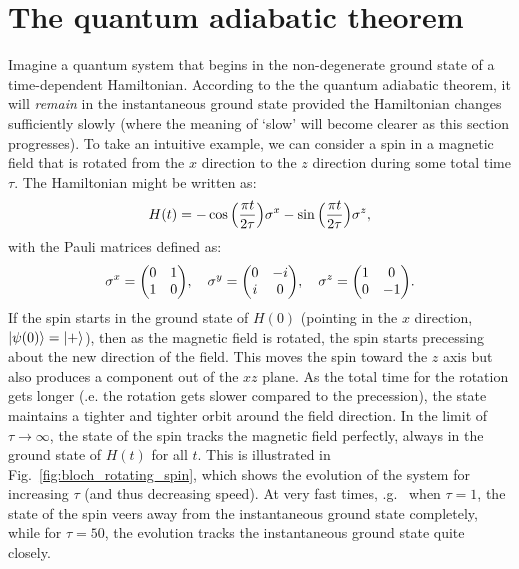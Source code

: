     \section{The quantum adiabatic theorem}\label{sec:2.1_adiabatic_theorem}
    
    Imagine a quantum system that begins in the non-degenerate ground state of a time-dependent Hamiltonian. According to the the quantum adiabatic theorem, it will \emph{remain} in the instantaneous ground state provided the Hamiltonian changes sufficiently slowly (where the meaning of `slow' will become clearer as this section progresses). To take an intuitive example, we can consider a spin in a magnetic field that is rotated from the $x$ direction to the $z$ direction during some total time $\tau$. The Hamiltonian might be written as:
    \begin{equation}\label{eq:rotating_spin_H}
        H(t) = -\cos\Big(\frac{\pi t}{2 \tau}\Big)\sigma^x - \sin \Big(\frac{\pi t}{2 \tau}\Big)\sigma^z,
    \end{equation}
    with the Pauli matrices defined as:
    \begin{equation}
        \sx = \mqty(0 & 1 \\ 1 & 0), \quad \sy = \mqty(0 & -i \\ i & 0), \quad \sz = \mqty(1 & 0 \\ 0 & -1).  
    \end{equation}
    If the spin starts in the ground state of $H(0)$ (pointing in the $x$ direction, $\ket{\psi(0)} = \ket{+}$), then as the magnetic field is rotated, the spin starts precessing about the new direction of the field. This moves the spin toward the $z$ axis but also produces a component out of the $xz$ plane. As the total time for the rotation gets longer (\@i.e. the rotation gets slower compared to the precession), the state maintains a tighter and tighter orbit around the field direction. In the limit of $\tau \rightarrow \infty$, the state of the spin tracks the magnetic field perfectly, always in the ground state of $H(t)$ for all $t$. This is illustrated in Fig.~\ref{fig:bloch_rotating_spin}, which shows the evolution of the system for increasing $\tau$ (and thus decreasing speed). At very fast times, \@e.g.~ when $\tau = 1$, the state of the spin veers away from the instantaneous ground state completely, while for $\tau = 50$, the evolution tracks the instantaneous ground state quite closely.
    
